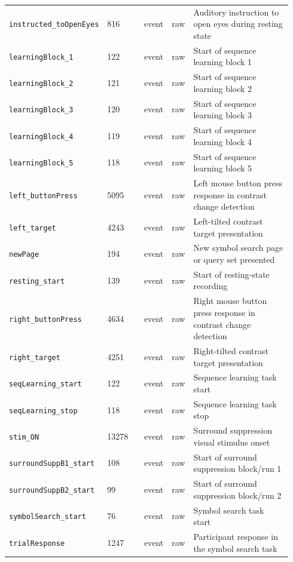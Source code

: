 {\begin{tcolorbox}
\begin{tabular}{@{}p{0.1567\linewidth}p{0.1567\linewidth}p{0.0783\linewidth}p{0.0783\linewidth}p{0.4700\linewidth}@{}}
\texttt{instructed\_\allowbreak{}toOpenEyes} & 816 & event & raw & Auditory instruction to open eyes during resting state \\
\texttt{learningBlock\_\allowbreak{}1} & 122 & event & raw & Start of sequence learning block 1 \\
\texttt{learningBlock\_\allowbreak{}2} & 121 & event & raw & Start of sequence learning block 2 \\
\texttt{learningBlock\_\allowbreak{}3} & 120 & event & raw & Start of sequence learning block 3 \\
\texttt{learningBlock\_\allowbreak{}4} & 119 & event & raw & Start of sequence learning block 4 \\
\texttt{learningBlock\_\allowbreak{}5} & 118 & event & raw & Start of sequence learning block 5 \\
\texttt{left\_\allowbreak{}buttonPress} & 5095 & event & raw & Left mouse button press response in contrast change detection \\
\texttt{left\_\allowbreak{}target} & 4243 & event & raw & Left-tilted contrast target presentation \\
\texttt{newPage} & 194 & event & raw & New symbol search page or query set presented \\
\texttt{resting\_\allowbreak{}start} & 139 & event & raw & Start of resting-state recording \\
\texttt{right\_\allowbreak{}buttonPress} & 4634 & event & raw & Right mouse button press response in contrast change detection \\
\texttt{right\_\allowbreak{}target} & 4251 & event & raw & Right-tilted contrast target presentation \\
\texttt{seqLearning\_\allowbreak{}start} & 122 & event & raw & Sequence learning task start \\
\texttt{seqLearning\_\allowbreak{}stop} & 118 & event & raw & Sequence learning task stop \\
\texttt{stim\_\allowbreak{}ON} & 13278 & event & raw & Surround suppression visual stimulus onset \\
\texttt{surroundSuppB1\_\allowbreak{}start} & 108 & event & raw & Start of surround suppression block/run 1 \\
\texttt{surroundSuppB2\_\allowbreak{}start} & 99 & event & raw & Start of surround suppression block/run 2 \\
\texttt{symbolSearch\_\allowbreak{}start} & 76 & event & raw & Symbol search task start \\
\texttt{trialResponse} & 1247 & event & raw & Participant response in the symbol search task \\

\end{tabular}
\end{tcolorbox}}
